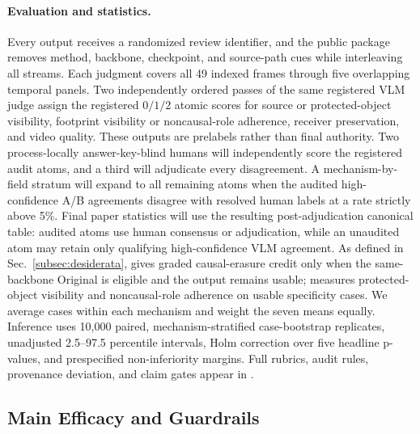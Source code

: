\paragraph{Evaluation and statistics.}
Every output receives a randomized review identifier, and the public package
removes method, backbone, checkpoint, and source-path cues while interleaving
all streams. Each judgment covers all 49 indexed frames through five
overlapping temporal panels. Two independently ordered passes of the same registered
VLM judge assign the registered \(0/1/2\) atomic scores for source or
protected-object visibility, footprint visibility or noncausal-role
adherence, receiver preservation, and video quality. These outputs are
prelabels rather than final authority. Two process-locally answer-key-blind
humans will independently score the registered audit atoms, and a third will
adjudicate every disagreement. A mechanism-by-field stratum will expand to all
remaining atoms when the audited high-confidence A/B agreements disagree with
resolved human labels at a rate strictly above 5\%. Final paper statistics
will use the
resulting post-adjudication canonical table: audited atoms use human consensus
or adjudication, while an unaudited atom may retain only qualifying
high-confidence VLM agreement. As defined in
Sec.~\ref{subsec:desiderata}, \ces{} gives graded causal-erasure credit only
when the same-backbone Original is eligible and the output remains usable;
\su{} measures protected-object visibility and noncausal-role adherence on
usable specificity cases. We average cases within each mechanism and weight
the seven means equally. Inference uses 10,000 paired,
mechanism-stratified case-bootstrap replicates, unadjusted 2.5--97.5
percentile intervals, Holm correction over five headline p-values, and prespecified
non-inferiority margins. Full rubrics, audit rules, provenance deviation, and
claim gates appear in .

\ifoutline
  
\fi

\subsection{Main Efficacy and Guardrails}
\label{subsec:main-results}

